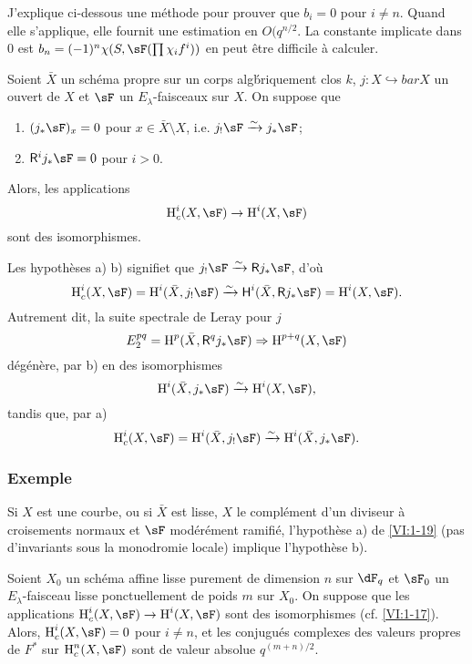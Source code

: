 J'explique ci-dessous une m\'ethode pour prouver que $b_i=0$ pour $i\ne n$. 
Quand elle s'applique, elle fournit une estimation en $O(q^{n/2}$. La constante 
implicate dans $0$ est $b_n=(-1)^n \chi(S,\sF(\prod \chi_i f^i))$ en peut 
\^etre difficile \`a calculer. 





\begin{proposition_}\label{VI:1-19}
Soient $\bar X$ un sch\'ema propre sur un corps alg\'briquement clos $k$, 
$j:X\hookrightarrow bar X$ un ouvert de $X$ et $\sF$ un $E_\lambda$-faisceaux 
sur $X$. On suppose que 
\begin{enumerate}[\indent a)]
  \item $(j_\ast\sF)_x = 0$ pour $x\in \bar X\setminus X$, i.e. 
    $j_!\sF\iso j_\ast\sF$; 
  \item $\R^i j_\ast \sF = 0$ pour $i>0$.
\end{enumerate}
Alors, les applications 
\[
  \h_c^i(X,\sF) \to \h^i(X,\sF)
\]
sont des isomorphismes. 
\end{proposition_}

Les hypoth\`eses a) b) signifiet que $j_! \sF \iso \R j_\ast \sF$, d'o\`u 
\[
  \h_c^i(X,\sF) = \h^i(\bar X,j_!\sF) \iso \hh^i(\bar X,\R j_\ast \sF) = \h^i(X,\sF) \text{.}
\]
Autrement dit, la suite spectrale de Leray pour $j$ 
\[
  E_2^{pq} = \h^p(\bar X,\R^q j_\ast \sF) \Rightarrow \h^{p+q}(X,\sF) 
\]
d\'eg\'en\`ere, par b) en des isomorphismes 
\[
  \h^i(\bar X,j_\ast\sF) \iso \h^i(X,\sF) \text{,}
\]
tandis que, par a) 
\[
  \h_c^i(X,\sF) = \h^i(\bar X,j_!\sF) \iso \h^i(\bar X,j_\ast\sF) \text{.}
\]





\subsubsection{Exemple}\label{VI:1-19-1}

Si $X$ est une courbe, ou si $\bar X$ est lisse, $X$ le compl\'ement d'un 
diviseur \`a croisements normaux et $\sF$ mod\'er\'ement ramifi\'e, 
l'hypoth\`ese a) de \ref{VI:1-19} (pas d'invariants sous la monodromie locale) 
implique l'hypoth\`ese b). 





\begin{proposition_}\label{VI:1-20}
Soient $X_0$ un sch\'ema affine lisse purement de dimension $n$ sur $\dF_q$ et 
$\sF_0$ un $E_\lambda$-faisceau lisse ponctuellement de poids $m$ sur $X_0$. On 
suppose que les applications $\h_c^i(X,\sF) \to \h^i(X,\sF)$ sont des 
isomorphismes (cf. \ref{VI:1-17}). Alors, $\h_c^i(X,\sF) = 0$ pour $i\ne n$, et 
les conjugu\'es complexes des valeurs propres de $F^\ast$ sur $\h_c^n(X,\sF)$ 
sont de valeur absolue $q^{(m+n)/2}$. 
\end{proposition_}

